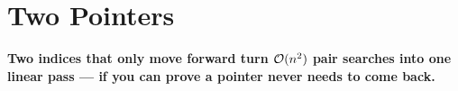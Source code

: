 \chapter{Two Pointers}
\label{ch:two_pointers}

\begin{tcolorbox}[enhanced, colback=white, colframe=secondaryblue, boxrule=1pt, arc=2mm]
\textbf{\large\textcolor{primaryblue}{Two indices that only move forward turn $\mathcal{O}(n^2)$ pair searches into one linear pass --- if you can prove a pointer never needs to come back.}}
\end{tcolorbox}


